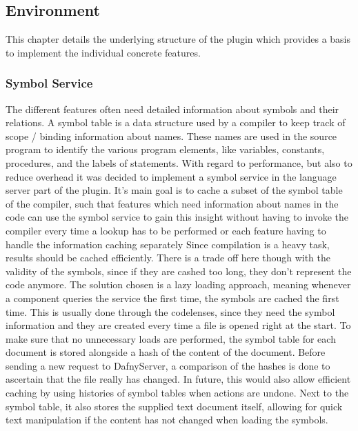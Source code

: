 \subsection{Environment}\label{environment}
This chapter details the underlying structure of the plugin which provides a basis to implement the individual concrete features.

\subsubsection{Symbol Service}\label{symbolservice}
The different features often need detailed information about symbols and their relations. A symbol table is a data structure used by a compiler to keep track of scope / binding information about names. These names are used in the source program to identify the various program elements, like variables, constants, procedures, and the labels of statements.\cite[239]{compiler} \newline
With regard to performance, but also to reduce overhead it was decided to implement a symbol service in the language server part of the plugin. It's main goal is to cache a subset of the symbol table of the compiler, such that features which need information about names in the code can use the symbol service to gain this insight without having to invoke the compiler every time a lookup has to be performed or each feature having to handle the information caching separately \newline
Since compilation is a heavy task, results should be cached efficiently. There is a trade off here though with the validity of the symbols, since if they are cashed too long, they don't represent the code anymore. The solution chosen is a lazy loading approach, meaning whenever a component queries the service the first time, the symbols are cached the first time. This is usually done through the codelenses, since they need the symbol information and they are created every time a file is opened right at the start. To make sure that no unnecessary loads are performed, the symbol table for each document is stored alongside a hash of the content of the document. Before sending a new request to DafnyServer, a comparison of the hashes is done to ascertain that the file really has changed. In future, this would also allow efficient caching by using histories of symbol tables when actions are undone. Next to the symbol table, it also stores the supplied text document itself, allowing for quick text manipulation if the content has not changed when loading the symbols.\newline
